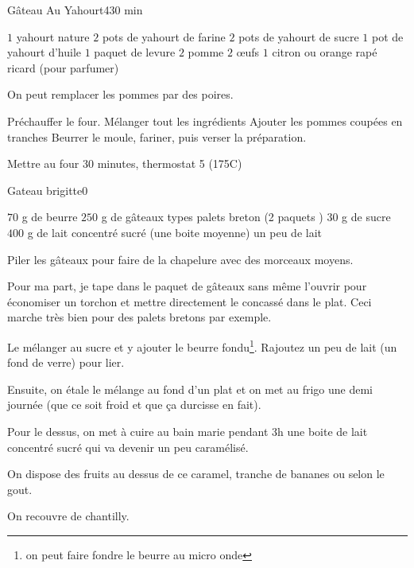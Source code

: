 \begin{recette}{Gâteau Au Yahourt}{4}{}{30 min}

\begin{ingredients}
\ingredient $1$ yahourt nature
\ingredient $2$ pots de yahourt de farine
\ingredient $2$ pots de yahourt de sucre
\ingredient $1$ pot de yahourt d'huile
\ingredient $1$ paquet de levure
\ingredient $2$ pomme
\ingredient $2$ œufs
\ingredient $1$ citron ou orange rapé
\ingredient ricard (pour parfumer)
\end{ingredients}

\begin{remarque}
On peut remplacer les pommes par des poires.
\end{remarque}

\begin{preparation}
\etape Préchauffer le four.
\etape Mélanger tout les ingrédients
\etape Ajouter les pommes coupées en tranches
\etape Beurrer le moule, fariner, puis verser la préparation.
\end{preparation}

\begin{cuisson}
Mettre au four 30 minutes, thermostat 5 (175\degres C)
\end{cuisson}
\end{recette}

\begin{recette}{Gateau brigitte}{0}{}{}
\begin{ingredients}
\ingredient $70$ g de beurre
\ingredient $250$ g de gâteaux types palets breton (2 paquets )
\ingredient $30$ g de sucre
\ingredient $400$ g de lait concentré sucré (une boite moyenne)
\ingredient un peu de lait
\end{ingredients}

\begin{preparation}
\etape Piler les gâteaux pour faire de la chapelure avec des morceaux moyens.

\begin{remarque}
Pour ma part, je tape dans le paquet de gâteaux sans même l'ouvrir pour économiser un torchon et mettre directement le concassé dans le plat. Ceci marche très bien pour des palets bretons par exemple.
\end{remarque}

\etape Le mélanger au sucre et y ajouter le beurre fondu\footnote{on peut faire fondre le beurre au micro onde}. Rajoutez un peu de lait (un fond de verre) pour lier.

\etape Ensuite, on étale le mélange au fond d'un plat et on met au frigo une demi journée (que ce soit froid et que ça durcisse en fait).

\etape Pour le dessus, on met à cuire au bain marie pendant 3h une boite de lait concentré sucré qui va devenir un peu caramélisé.

\etape On dispose des fruits au dessus de ce caramel, tranche de bananes ou selon le gout.

\etape On recouvre de chantilly.
\end{preparation}

\end{recette}

